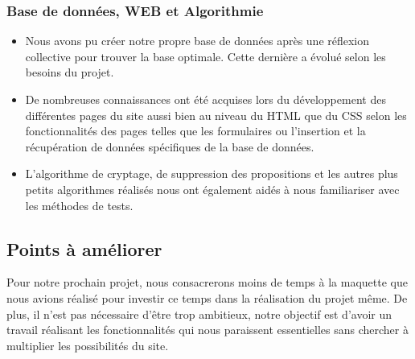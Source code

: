 \documentclass{article}
\begin{document}
    \subsubsection{Base de données, WEB et Algorithmie}
    \begin{itemize}
    \item Nous avons pu créer notre propre base de données après une réflexion collective pour trouver la base optimale. Cette dernière a évolué selon les besoins du projet.
    \item De nombreuses connaissances ont été acquises lors du développement des différentes pages du site aussi bien au niveau du HTML que du CSS selon les fonctionnalités des pages telles que les formulaires ou l'insertion et la récupération de données spécifiques de la base de données.
    \item L'algorithme de cryptage, de suppression des propositions et les autres plus petits algorithmes réalisés nous ont également aidés à nous familiariser avec les méthodes de tests.
   \end{itemize}

\subsection{Points à améliorer}
Pour notre prochain projet, nous consacrerons moins de temps à la maquette que nous avions réalisé pour investir ce temps dans la réalisation du projet même. De plus, il n'est pas nécessaire d'être trop ambitieux, notre objectif est d'avoir un travail réalisant les fonctionnalités qui nous paraissent essentielles sans chercher à multiplier les possibilités du site.
\end{document}
